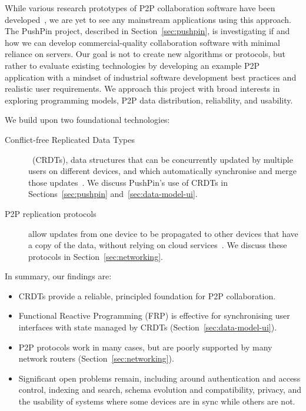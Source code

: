 \documentclass[sigplan,10pt]{acmart}
\begin{document}
While various research prototypes of P2P collaboration software have been developed~\cite{Nedelec:2016eo,vanderLinde:2017fu,Nicolaescu:2016ei}, we are yet to see any mainstream applications using this approach.
The PushPin project, described in Section~\ref{sec:pushpin}, is investigating if and how we can develop commercial-quality collaboration software with minimal reliance on servers.
Our goal is not to create new algorithms or protocols, but rather to evaluate existing technologies by developing an example P2P application with a mindset of industrial software development best practices and realistic user requirements.
We approach this project with broad interests in exploring programming models, P2P data distribution, reliability, and usability.

We build upon two foundational technologies:
\begin{description}
\item[Conflict-free Replicated Data Types] ~(CRDTs), data structures that can be concurrently updated by multiple users on different devices, and which automatically synchronise and merge those updates~\cite{Shapiro:2011un,Gomes:2017gy}.
We discuss PushPin's use of CRDTs in Sections~\ref{sec:pushpin} and~\ref{sec:data-model-ui}.
\item[P2P replication protocols] allow updates from one device to be propagated to other devices that have a copy of the data, without relying on cloud services~\cite{Ogden:2018ur,Tarr:2019ba,Guy:1999gy}.
We discuss these protocols in Section~\ref{sec:networking}.
\end{description}

In summary, our findings are:
\begin{itemize}
    \item CRDTs provide a reliable, principled foundation for P2P collaboration.
    \item Functional Reactive Programming (FRP) is effective for synchronising user interfaces with state managed by CRDTs (Section~\ref{sec:data-model-ui}).
    \item P2P protocols work in many cases, but are poorly supported by many network routers (Section~\ref{sec:networking}).
    \item Significant open problems remain, including around authentication and access control, indexing and search, schema evolution and compatibility, privacy, and the usability of systems where some devices are in sync while others are not.
\end{itemize}
\end{document}
